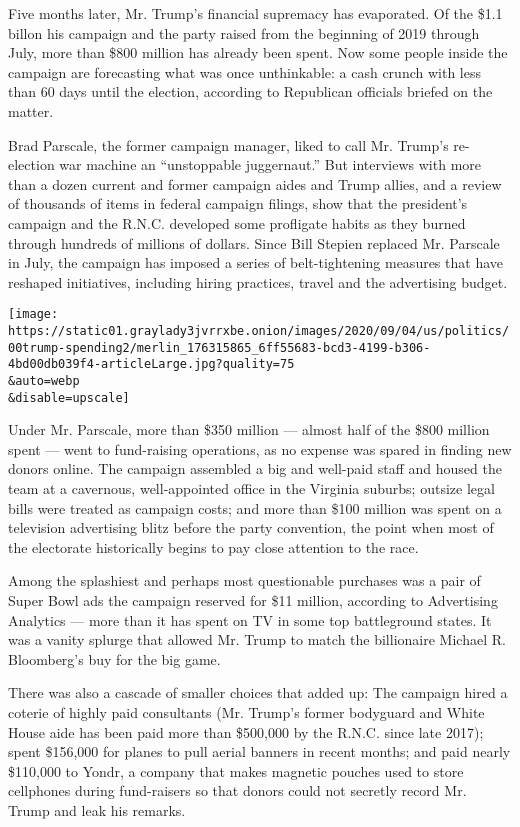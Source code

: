 Five months later, Mr. Trump's financial supremacy has evaporated. Of
the \$1.1 billon his campaign and the party raised from the beginning of
2019 through July, more than \$800 million has already been spent. Now
some people inside the campaign are forecasting what was once
unthinkable: a cash crunch with less than 60 days until the election,
according to Republican officials briefed on the matter.

Brad Parscale, the former campaign manager, liked to call Mr. Trump's
re-election war machine an ``unstoppable juggernaut.'' But interviews
with more than a dozen current and former campaign aides and Trump
allies, and a review of thousands of items in federal campaign filings,
show that the president's campaign and the R.N.C. developed some
profligate habits as they burned through hundreds of millions of
dollars. Since Bill Stepien replaced Mr. Parscale in July, the campaign
has imposed a series of belt-tightening measures that have reshaped
initiatives, including hiring practices, travel and the advertising
budget.

\texttt{[image: https://static01.graylady3jvrrxbe.onion/images/2020/09/04/us/politics/00trump-spending2/merlin\_176315865\_6ff55683-bcd3-4199-b306-4bd00db039f4-articleLarge.jpg?quality=75\\\&auto=webp\\\&disable=upscale]}

Under Mr. Parscale, more than \$350 million --- almost half of the \$800
million spent --- went to fund-raising operations, as no expense was
spared in finding new donors online. The campaign assembled a big and
well-paid staff and housed the team at a cavernous, well-appointed
office in the Virginia suburbs; outsize legal bills were treated as
campaign costs; and more than \$100 million was spent on a television
advertising blitz before the party convention, the point when most of
the electorate historically begins to pay close attention to the race.

Among the splashiest and perhaps most questionable purchases was a pair
of Super Bowl ads the campaign reserved for \$11 million, according to
Advertising Analytics --- more than it has spent on TV in some top
battleground states. It was a vanity splurge that allowed Mr. Trump to
match the billionaire Michael R. Bloomberg's buy for the big game.

There was also a cascade of smaller choices that added up: The campaign
hired a coterie of highly paid consultants (Mr. Trump's former bodyguard
and White House aide has been paid more than \$500,000 by the R.N.C.
since late 2017); spent \$156,000 for planes to pull aerial banners in
recent months; and paid nearly \$110,000 to Yondr, a company that makes
magnetic pouches used to store cellphones during fund-raisers so that
donors could not secretly record Mr. Trump and leak his remarks.

